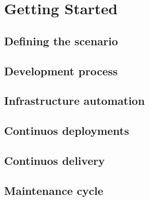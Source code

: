 \chapter{Getting Started}

\section{Defining the scenario}

\section{Development process}

\section{Infrastructure automation}

\section{Continuos deployments}

\section{Continuos delivery}

\section{Maintenance cycle}